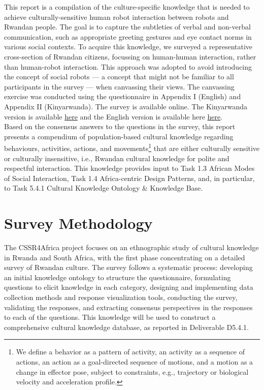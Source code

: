 \documentclass{CSSRforAfrica}
\begin{document}
This report is a compilation of the culture-specific knowledge that is needed to achieve culturally-sensitive human robot interaction between robots and Rwandan people. The goal is to capture  the subtleties of verbal and non-verbal communication, such as appropriate greeting gestures and eye contact norms in various social contexts.   To acquire this knowledge, we surveyed a representative cross-section of Rwandan citizens, focussing on human-human interaction, rather than human-robot interaction. This approach was adopted to avoid introducing the concept of social robots --- a concept that might not be familiar to all participants in the survey --- when canvassing their views.   The canvassing exercise was conducted  using the questionnaire in Appendix I (English) and Appendix II (Kinyarwanda). The survey is available online. The Kinyarwanda version is available  \href{https://docs.google.com/forms/d/e/1FAIpQLScSu95pCT2MsRohukI9ib6GxsuyXuQozeqGQXO9DYcDD5RvlQ/viewform}{here} and the English version is available here \href{https://docs.google.com/forms/d/e/1FAIpQLSc-5lz0YfPCtK5BSL6cGkmlJVkE0vwyKXppkhXs4l1rYPwKlA/viewform}{here}.\\

\noindent Based on the consensus answers to the questions in the survey, this report   presents a compendium of population-based cultural knowledge regarding behaviours, activities, actions, and movements\footnote{We define a behavior as a pattern of activity, an activity as a sequence of actions, an action as a goal-directed sequence of motions, and a motion as a change in effector pose, subject to constraints, e.g., trajectory or  biological  velocity and acceleration profile.}  that are either culturally sensitive or culturally insensitive, i.e., Rwandan cultural knowledge for polite and respectful interaction. This knowledge provides input to Task 1.3 African Modes of Social Interaction, Task 1.4 Africa-centric Design Patterns,  and, in particular, to Task 5.4.1 Cultural Knowledge Ontology \& Knowledge Base.



\section{Survey Methodology}
 \label{section:methodology}

The CSSR4Africa project focuses on an ethnographic study of cultural knowledge in Rwanda and South Africa, with the first phase concentrating on a detailed survey of Rwandan culture. The survey follows a systematic process:  developing an initial knowledge ontology to structure the questionnaire, formulating questions to elicit knowledge in each category,  designing and implementing data collection methods and response visualization tools,  conducting the survey,  validating the responses, and extracting consensus perspectives in the responses to each of the questions. This knowledge will be used to construct a  comprehensive cultural knowledge database, as reported in Deliverable D5.4.1.
\end{document}
